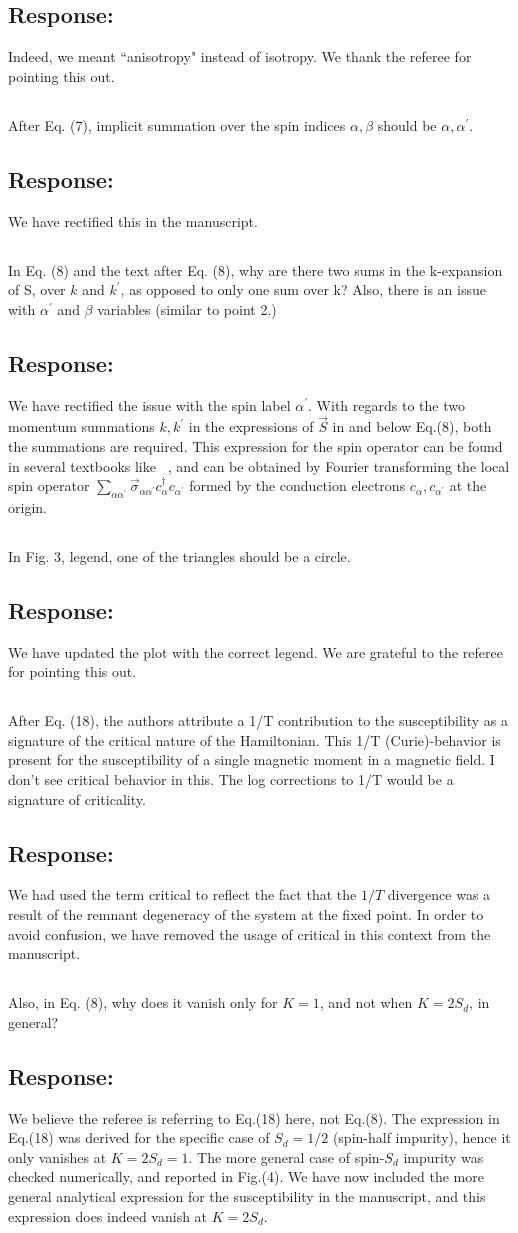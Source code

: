 \documentclass{article}
\newcommand{\response}[1]{{\color{blue}\subsection*{Response:}{#1}}}
\newcommand{\point}[1]{\subsection{}{#1}}
\begin{document}
\response{ Indeed, we meant ``anisotropy" instead of isotropy. We thank the referee for pointing this out.}

\point{ 
After Eq. (7), implicit summation over the spin indices $\alpha,\beta$ should be $\alpha,\alpha^\prime$.}

\response{ We have rectified this in the manuscript.}

\point{ 
In Eq. (8) and the text after Eq. (8), why are there two sums in the
k-expansion of S, over $k$ and $k^\prime$, as opposed to only one sum over k? Also, there is an issue with $\alpha^\prime$ and $\beta$ variables (similar to point 2.)}

\response{We have rectified the issue with the spin label \(\alpha^\prime\). With regards to the two momentum summations \(k,k^\prime\) in the expressions of \(\vec S\) in and below Eq.(8), both the summations are required. This expression for the spin operator can be found in several textbooks like ~\cite{coleman2015,hewson1993}, and can be obtained by Fourier transforming the local spin operator \(\sum_{\alpha\alpha^\prime}\vec \sigma_{\alpha\alpha^\prime}c^\dagger_{\alpha}c_{\alpha^\prime}\) formed by the conduction electrons \(c_{\alpha},c_{\alpha^\prime}\) at the origin.}

\point{
In Fig. 3, legend, one of the triangles should be a circle.}

\response{ We have updated the plot with the correct legend. We are grateful to the referee for pointing this out.}

\point{
After Eq. (18), the authors attribute a 1/T contribution to the
susceptibility as a signature of the critical nature of the Hamiltonian. This 1/T (Curie)-behavior is present for the susceptibility of a single magnetic moment in a magnetic field. I don't see critical behavior in this. The log corrections to 1/T would be a signature of criticality.}

\response{We had used the term critical to reflect the fact that the \(1/T\) divergence was a result of the remnant degeneracy of the system at the fixed point. In order to avoid confusion, we have removed the usage of critical in this context from the manuscript.}

\point{
Also, in Eq. (8), why does it vanish only for $K=1$, and not when $K=2S_{d}$, in general?}

\response{We believe the referee is referring to Eq.(18) here, not Eq.(8). The expression in Eq.(18) was derived for the specific case of $S_d = 1/2$ (spin-half impurity), hence it only vanishes at $K=2S_d=1$. The more general case of spin-\(S_d\) impurity was checked numerically, and reported in Fig.(4). We have now included the more general analytical expression for the susceptibility in the manuscript, and this expression does indeed vanish at $K = 2S_d$.}
\end{document}
